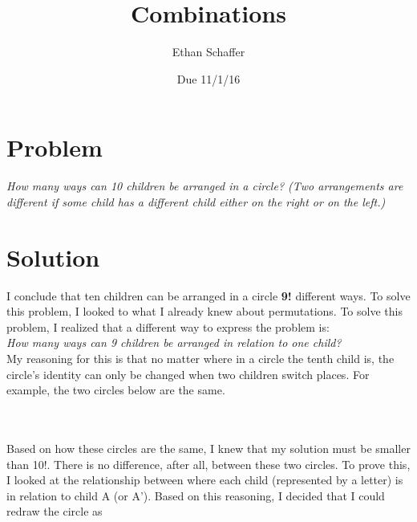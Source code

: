 \documentclass[11pt]{article} %
\title{Combinations}
\author{Ethan Schaffer}
\date{Due 11/1/16}
\newcommand\tab[1][1cm]{\hspace*{#1}}
\begin{document}
\maketitle
\section* {Problem}
\textit{How many ways can 10 children be arranged in a circle? (Two arrangements are different if some child has a different child either on the right or on the left.)}

\section*{Solution}
I conclude that ten children can be arranged in a circle \textbf{9!} different ways. To solve this problem, I looked to what I already knew about permutations. To solve this problem, I realized that a different way to express the problem is: 
\\ \textit{How many ways can 9 children be arranged in relation to one child?}
\\ \tab My reasoning for this is that no matter where in a circle the tenth child is, the circle's identity can only be changed when two children switch places. For example, the two circles below are the same.
\\
\\
\\ Based on how these circles are the same, I knew that my solution must be smaller than 10!. There is no difference, after all, between these two circles. To prove this, I looked at the relationship between where each child (represented by a letter) is in relation to child A (or A'). Based on this reasoning,  I decided that I could redraw the circle as
\end{document}

